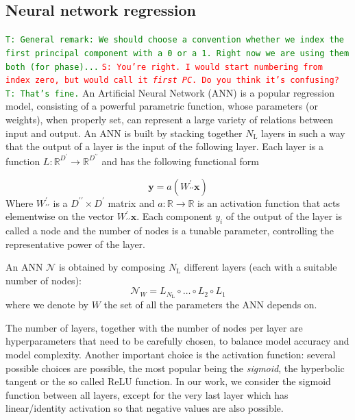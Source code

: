 \documentclass[twocolumn,showpacs,preprintnumbers,nofootinbib,prd,
superscriptaddress,10pt]{revtex4-1}
\newcommand{\R}{\mathbb{R}}
\newcommand{\stefano}[1]{{\textcolor{red}{\texttt{S: #1}} }}
\newcommand{\tim}[1]{{\textcolor{green}{\texttt{T: #1}} }}
\begin{document}

\subsection{Neural network regression}
\label{sec:NN}

\tim{General remark: We should choose a convention whether we index the first principal component with a 0 or a 1. Right now we are using them both (for phase)...}
\stefano{You're right. I would start numbering from index zero, but would call it {\it first PC}. Do you think it's confusing?} \tim{That's fine.}
An Artificial Neural Network (ANN) is a popular regression model, consisting of a powerful parametric function, whose parameters (or weights), when properly set, can represent a large variety of relations between input and output.
An ANN is built by stacking together $N_\text{L}$ layers in such a way that the output of a layer is the input of the following layer. Each layer is a function $L: \R^{D^\prime} \rightarrow \R^{D^{\prime\prime}} $ and has the following functional form

\begin{equation}
	\boldsymbol{y} = a(W^{\prime}_{\prime\prime}\boldsymbol{x})
\end{equation}
%
Where $W^{\prime}_{\prime\prime}$ is a $D^{\prime\prime} \times D^{\prime}$ matrix and $a: \R \rightarrow \R$ is an activation function that acts elementwise on the vector $W^{\prime}_{\prime\prime}\boldsymbol{x}$.
Each component $y_i$ of the output of the layer is called a node and the number of nodes is a tunable parameter, controlling the representative power of the layer.

An ANN $\mathcal{N}$ is obtained by composing $N_\text{L}$ different layers (each with a suitable number of nodes):
%
\begin{equation}
	\mathcal{N}_W = L_{N_\text{L}} \circ \hdots \circ L_2 \circ L_1
\end{equation}
%
where we denote by $W$ the set of all the parameters the ANN depends on.

The number of layers, together with the number of nodes per layer are hyperparameters that need to be carefully chosen, to balance model accuracy and model complexity.
Another important choice is the activation function: several possible choices are possible, the most popular being the {\it sigmoid}, the hyperbolic tangent or the so called ReLU function. In our work, we consider the sigmoid function between all layers, except for the very last layer which has linear/identity activation so that negative values are also possible.
\end{document}
